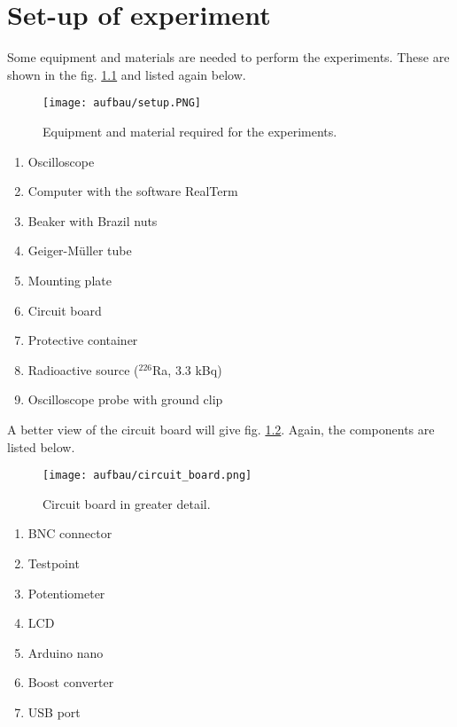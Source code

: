 \chapter{Set-up of experiment}
%
Some equipment and materials are needed to perform the experiments. These are shown in the fig. \ref{fig:setup} and listed again below.
%
\begin{figure}[H]
	\begin{center}
		\texttt{[image: aufbau/setup.PNG]} %
		\caption{Equipment and material required for the experiments.}  
		\label{fig:setup} %
	\end{center}
\end{figure}
%
\begin{enumerate}
	\item Oscilloscope
	\item Computer with the software RealTerm
	\item Beaker with Brazil nuts
	\item Geiger-Müller tube
	\item Mounting plate
	\item Circuit board
	\item Protective container
	\item Radioactive source ($^{226}$Ra, 3.3 kBq)
	\item Oscilloscope probe with ground clip
\end{enumerate}
%
A better view of the circuit board will give fig. \ref{fig:circuit_board}. Again, the components are listed below.
%
\begin{figure}[H]
	\begin{center}
		\texttt{[image: aufbau/circuit\_board.png]}
		\caption{Circuit board in greater detail.} %
		\label{fig:circuit_board} %
	\end{center}
\end{figure}
%
\begin{enumerate}
	\item BNC connector
	\item Testpoint
	\item Potentiometer
	\item LCD
	\item Arduino nano
	\item Boost converter
	\item USB port
\end{enumerate}
